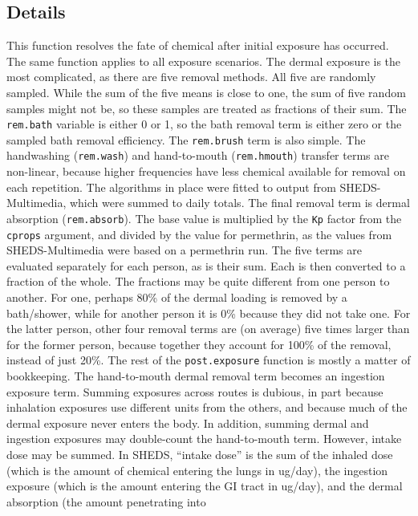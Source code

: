 \documentclass[
]{article}
\begin{document}
\hypertarget{details-21}{%
\subsection{Details}\label{details-21}}

This function resolves the fate of chemical after initial exposure has
occurred. The same function applies to all exposure scenarios. The
dermal exposure is the most complicated, as there are five removal
methods. All five are randomly sampled. While the sum of the five means
is close to one, the sum of five random samples might not be, so these
samples are treated as fractions of their sum. The \texttt{rem.bath}
variable is either 0 or 1, so the bath removal term is either zero or
the sampled bath removal efficiency. The \texttt{rem.brush} term is also
simple. The handwashing (\texttt{rem.wash}) and hand-to-mouth
(\texttt{rem.hmouth}) transfer terms are non-linear, because higher
frequencies have less chemical available for removal on each repetition.
The algorithms in place were fitted to output from SHEDS-Multimedia,
which were summed to daily totals. The final removal term is dermal
absorption (\texttt{rem.absorb}). The base value is multiplied by the
\texttt{Kp} factor from the \texttt{cprops} argument, and divided by the
value for permethrin, as the values from SHEDS-Multimedia were based on
a permethrin run. The five terms are evaluated separately for each
person, as is their sum. Each is then converted to a fraction of the
whole. The fractions may be quite different from one person to another.
For one, perhaps 80\% of the dermal loading is removed by a bath/shower,
while for another person it is 0\% because they did not take one. For
the latter person, other four removal terms are (on average) five times
larger than for the former person, because together they account for
100\% of the removal, instead of just 20\%. The rest of the
\texttt{post.exposure} function is mostly a matter of bookkeeping. The
hand-to-mouth dermal removal term becomes an ingestion exposure term.
Summing exposures across routes is dubious, in part because inhalation
exposures use different units from the others, and because much of the
dermal exposure never enters the body. In addition, summing dermal and
ingestion exposures may double-count the hand-to-mouth term. However,
intake dose may be summed. In SHEDS, ``intake dose'' is the sum of the
inhaled dose (which is the amount of chemical entering the lungs in
ug/day), the ingestion exposure (which is the amount entering the GI
tract in ug/day), and the dermal absorption (the amount penetrating into
\end{document}
